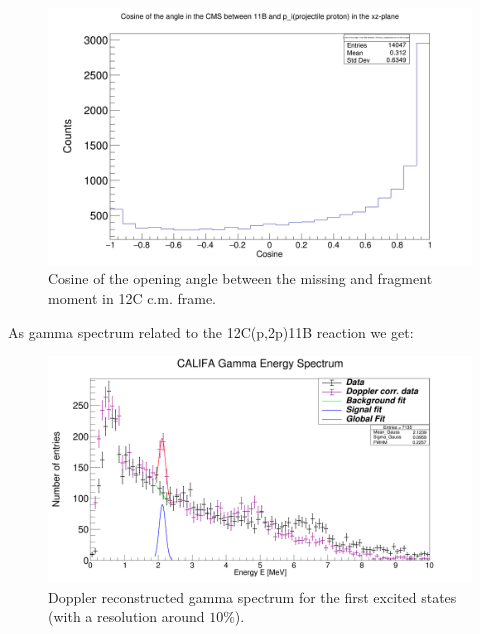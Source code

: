 \documentclass{report}
\begin{document}
\newline
\begin{figure}[!htb]
  \includegraphics[width=\linewidth]{cos_11B_p_i.png}
  \caption{Cosine of the opening angle between the missing and fragment moment in 12C c.m. frame.}
\end{figure}
\newline
\newpage

As gamma spectrum related to the 12C(p,2p)11B reaction we get:\newline
\begin{figure}[!htb]
  \includegraphics[width=\linewidth]{gamma_spec.png}
  \caption{Doppler reconstructed gamma spectrum for the first excited states (with a resolution around $10\%$).}
\end{figure}
\newline
\end{document}
